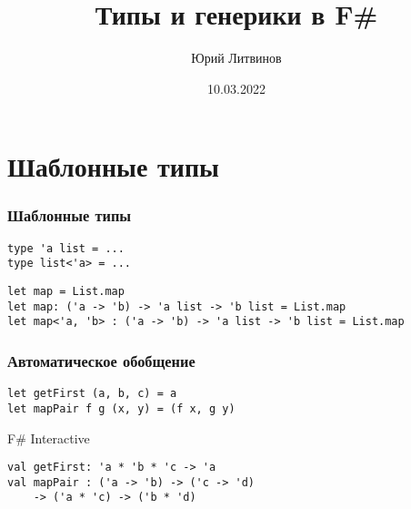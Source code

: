 \documentclass[xetex,mathserif,serif]{beamer}
\title{Типы и генерики в F\#}
\author{Юрий Литвинов}
\date{10.03.2022}
\begin{document}
    \frame{\titlepage}

    \section{Шаблонные типы}
    
    \begin{frame}[fragile]
        \frametitle{Шаблонные типы}
        \begin{verbatim}
type 'a list = ...
type list<'a> = ...
        \end{verbatim}

        \begin{verbatim}
let map = List.map
let map: ('a -> 'b) -> 'a list -> 'b list = List.map
let map<'a, 'b> : ('a -> 'b) -> 'a list -> 'b list = List.map
        \end{verbatim}
    \end{frame}

    \begin{frame}[fragile]
        \frametitle{Автоматическое обобщение}
        \begin{verbatim}
let getFirst (a, b, c) = a
let mapPair f g (x, y) = (f x, g y)
        \end{verbatim}

        \begin{alertblock}{F\# Interactive}
            \begin{verbatim}
val getFirst: 'a * 'b * 'c -> 'a
val mapPair : ('a -> 'b) -> ('c -> 'd) 
    -> ('a * 'c) -> ('b * 'd)
            \end{verbatim}
        \end{alertblock}
    \end{frame}
\end{document}
